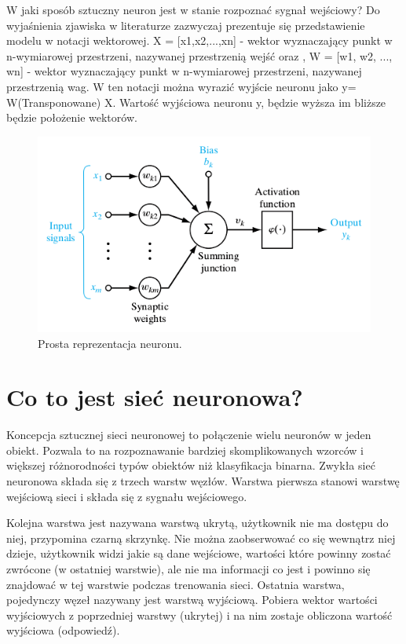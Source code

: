 \documentclass[12pt,a4paper,twoside,titlepage,openright]{book}
\begin{document}
W jaki sposób sztuczny neuron jest w stanie rozpoznać sygnał wejściowy? Do wyjaśnienia zjawiska w literaturze zazwyczaj prezentuje się przedstawienie modelu w notacji wektorowej.
X = [x1,x2,...,xn] - wektor wyznaczający punkt w n-wymiarowej przestrzeni, nazywanej przestrzenią wejść oraz , W = [w1, w2, ..., wn] - wektor wyznaczający punkt w n-wymiarowej przestrzeni, nazywanej przestrzenią wag. W ten notacji można wyrazić wyjście neuronu jako y= W(Transponowane) X. Wartość wyjściowa neuronu y, będzie wyższa im bliższe będzie położenie wektorów.

\begin{figure}[h]
	\centering
			\includegraphics[resolution=100]{Neuron.png}
		\caption{Prosta reprezentacja neuronu.}
\end{figure}


\section{Co to jest sieć neuronowa?}
Koncepcja sztucznej sieci neuronowej to połączenie wielu neuronów w jeden obiekt. Pozwala to na rozpoznawanie bardziej skomplikowanych wzorców i większej różnorodności typów obiektów niż klasyfikacja binarna. Zwykła sieć neuronowa składa się z trzech warstw węzłów. Warstwa pierwsza stanowi warstwę wejściową sieci i składa się z sygnału wejściowego.

Kolejna warstwa jest nazywana warstwą ukrytą, użytkownik nie ma dostępu do niej, przypomina czarną skrzynkę. Nie można zaobserwować co się wewnątrz niej dzieje, użytkownik widzi jakie są dane wejściowe, wartości które powinny zostać zwrócone (w ostatniej warstwie), ale nie ma informacji co jest i powinno się znajdować w tej warstwie podczas trenowania sieci.
Ostatnia warstwa, pojedynczy węzeł nazywany jest warstwą wyjściową. Pobiera wektor wartości wyjściowych z poprzedniej warstwy (ukrytej) i na nim zostaje obliczona wartość wyjściowa (odpowiedź).
\end{document}
